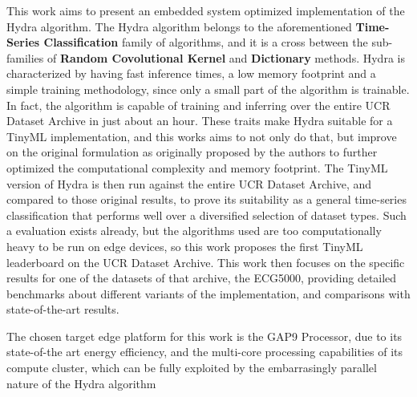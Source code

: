 This work aims to present an embedded system optimized implementation of the Hydra algorithm. 
The Hydra algorithm belongs to the aforementioned \textbf{Time-Series Classification} family of algorithms, and it is a cross between the sub-families of \textbf{Random Covolutional Kernel} and \textbf{Dictionary} methods. 
Hydra is characterized by having fast inference times, a low memory footprint and a simple training methodology, since only a small part of the algorithm is trainable. In fact, the algorithm is capable of training and inferring over
the entire UCR Dataset Archive in just about an hour. These traits make Hydra suitable for a TinyML implementation, and this works aims to not only do that, but improve on the original formulation as originally proposed by the authors
to further optimized the computational complexity and memory footprint. The TinyML version of Hydra is then run against the entire UCR Dataset Archive, and compared to those original results, to prove its suitability as a general 
time-series classification that performs well over a diversified selection of dataset types. Such a evaluation exists already, but the algorithms used are too computationally heavy to be run on edge devices, so this work proposes the first TinyML
leaderboard on the UCR Dataset Archive. This work then focuses on the specific results for one of the datasets of that archive, the ECG5000, providing detailed benchmarks about different variants of the implementation, and comparisons with state-of-the-art results.

The chosen target edge platform for this work is the GAP9 Processor, due to its state-of-the art energy efficiency, and the multi-core processing capabilities of its compute cluster, which can be fully exploited by the embarrasingly parallel nature of the Hydra algorithm